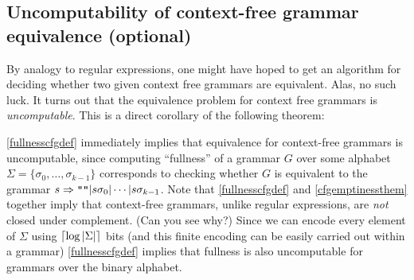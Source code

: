 \subsection{Uncomputability of context-free grammar equivalence
(optional)}\label{Uncomputability-of-contex}

By analogy to regular expressions, one might have hoped to get an
algorithm for deciding whether two given context free grammars are
equivalent. Alas, no such luck. It turns out that the equivalence
problem for context free grammars is \emph{uncomputable}. This is a
direct corollary of the following theorem:

\hypertarget{fullnesscfgdef}{}

\cref{fullnesscfgdef} immediately implies that equivalence for
context-free grammars is uncomputable, since computing ``fullness'' of a
grammar \(G\) over some alphabet
\(\Sigma = \{\sigma_0,\ldots,\sigma_{k-1} \}\) corresponds to checking
whether \(G\) is equivalent to the grammar
\(s \Rightarrow \ensuremath{\text{\texttt{""}}}|s\sigma_0|\cdots|s\sigma_{k-1}\).
Note that \cref{fullnesscfgdef} and \cref{cfgemptinessthem} together
imply that context-free grammars, unlike regular expressions, are
\emph{not} closed under complement. (Can you see why?) Since we can
encode every element of \(\Sigma\) using \(\lceil \log |\Sigma| \rceil\) bits
(and this finite encoding can be easily carried out within a grammar)
\cref{fullnesscfgdef} implies that fullness is also uncomputable for
grammars over the binary alphabet.

